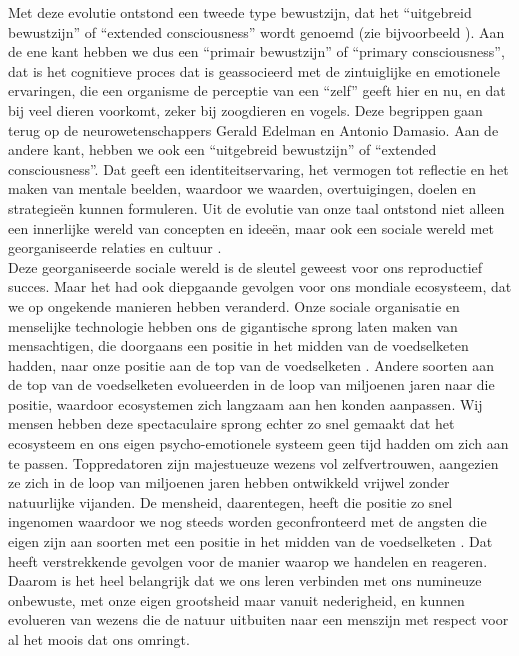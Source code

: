 \documentclass[
  11pt,
]{book}
\begin{document}
Met deze evolutie ontstond een tweede type bewustzijn, dat het ``uitgebreid bewustzijn'' of ``extended consciousness'' wordt genoemd (zie bijvoorbeeld \citet{capraLuisi2014}). Aan de ene kant hebben we dus een ``primair bewustzijn'' of ``primary consciousness'', dat is het cognitieve proces dat is geassocieerd met de zintuiglijke en emotionele ervaringen, die een organisme de perceptie van een ``zelf'' geeft hier en nu, en dat bij veel dieren voorkomt, zeker bij zoogdieren en vogels. Deze begrippen gaan terug op de neurowetenschappers Gerald Edelman en Antonio Damasio. Aan de andere kant, hebben we ook een ``uitgebreid bewustzijn'' of ``extended consciousness''. Dat geeft een identiteitservaring, het vermogen tot reflectie en het maken van mentale beelden, waardoor we waarden, overtuigingen, doelen en strategieën kunnen formuleren. Uit de evolutie van onze taal ontstond niet alleen een innerlijke wereld van concepten en ideeën, maar ook een sociale wereld met georganiseerde relaties en cultuur \citep{capraLuisi2014}.\\
Deze georganiseerde sociale wereld is de sleutel geweest voor ons reproductief succes. Maar het had ook diepgaande gevolgen voor ons mondiale ecosysteem, dat we op ongekende manieren hebben veranderd. Onze sociale organisatie en menselijke technologie hebben ons de gigantische sprong laten maken van mensachtigen, die doorgaans een positie in het midden van de voedselketen hadden, naar onze positie aan de top van de voedselketen \citep{Harari2015}. Andere soorten aan de top van de voedselketen evolueerden in de loop van miljoenen jaren naar die positie, waardoor ecosystemen zich langzaam aan hen konden aanpassen. Wij mensen hebben deze spectaculaire sprong echter zo snel gemaakt dat het ecosysteem en ons eigen psycho-emotionele systeem geen tijd hadden om zich aan te passen. Toppredatoren zijn majestueuze wezens vol zelfvertrouwen, aangezien ze zich in de loop van miljoenen jaren hebben ontwikkeld vrijwel zonder natuurlijke vijanden. De mensheid, daarentegen, heeft die positie zo snel ingenomen waardoor we nog steeds worden geconfronteerd met de angsten die eigen zijn aan soorten met een positie in het midden van de voedselketen \citep{Harari2015}. Dat heeft verstrekkende gevolgen voor de manier waarop we handelen en reageren. Daarom is het heel belangrijk dat we ons leren verbinden met ons numineuze onbewuste, met onze eigen grootsheid maar vanuit nederigheid, en kunnen evolueren van wezens die de natuur uitbuiten naar een menszijn met respect voor al het moois dat ons omringt.
\end{document}
